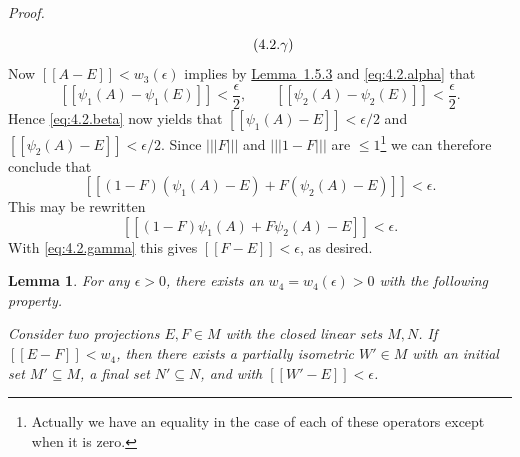 \documentclass[b5paper,twoside]{article}
\newcommand{\lemref}[2]{\hyperref[#1]{\mbox{Lemma~#2}}}
\theoremstyle{mvnplain}
\newtheorem{lemma}{Lemma}[section]
\renewenvironment{proof}[1][Proof]{%
  \par\addvspace{0.35\baselineskip}%
  \noindent\textit{#1.}\ \normalfont\ignorespaces
}{%
  \par\addvspace{0.35\baselineskip}%
}
\newcommand{\M}{\mathbf M}
\newcommand{\Metric}[1]{\left[\!\left[#1\right]\!\right]}
\newcommand{\OpNorm}[1]{\left\lvert\left\lvert\left\lvert#1\right\rvert\right\rvert\right\rvert}
\def\M{M}%
\def\Metric#1{[[#1]]}%
\def\mathfrak#1{#1}%
\begin{document}
\begin{proof}
\begin{equation}
  \tag{4.2.\ensuremath{\gamma}}
\end{equation}
Now \(\Metric{A-E}<w_3(\epsilon)\) implies by
\lemref{lem:1.5.3}{1.5.3} and \eqref{eq:4.2.alpha} that
\[
  \Metric{\psi_1(A)-\psi_1(E)}<\frac{\epsilon}{2},
  \qquad
  \Metric{\psi_2(A)-\psi_2(E)}<\frac{\epsilon}{2}.
\]
Hence \eqref{eq:4.2.beta} now yields that
\(\Metric{\psi_1(A)-E}<\epsilon/2\) and
\(\Metric{\psi_2(A)-E}<\epsilon/2\). Since \(\OpNorm{F}\) and
\(\OpNorm{1-F}\) are \(\le1\)\footnote{Actually we have an equality in the
case of each of these operators except when it is zero.} we can therefore
conclude that
\[
  \Metric{(1-F)(\psi_1(A)-E)+F(\psi_2(A)-E)}<\epsilon.
\]
This may be rewritten
\[
  \Metric{(1-F)\psi_1(A)+F\psi_2(A)-E}<\epsilon.
\]
With \eqref{eq:4.2.gamma} this gives \(\Metric{F-E}<\epsilon\), as desired.
\end{proof}

\begin{lemma}\label{lem:4.2.2}
For any \(\epsilon>0\), there exists an
\(w_4=w_4(\epsilon)>0\) with the following property.

Consider two projections \(E,F\in\M\) with the closed linear sets
\(\mathfrak M,\mathfrak N\). If \(\Metric{E-F}<w_4\), then there exists a
partially isometric \(W'\in\M\) with an initial set
\(\mathfrak M'\subseteq\mathfrak M\), a final set
\(\mathfrak N'\subseteq\mathfrak N\), and with
\(\Metric{W'-E}<\epsilon\).
\end{lemma}
\end{document}
